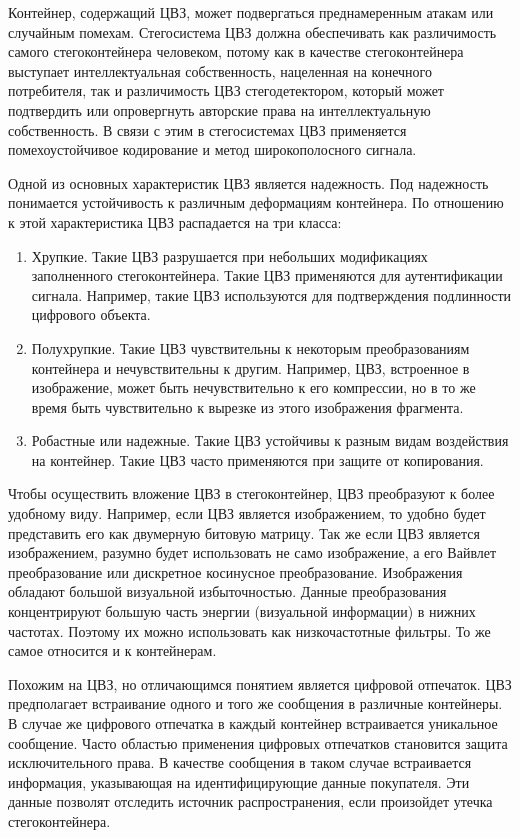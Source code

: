 Контейнер, содержащий ЦВЗ, может подвергаться преднамеренным атакам или случайным помехам.
Стегосистема ЦВЗ должна обеспечивать как различимость самого стегоконтейнера человеком,
потому как в качестве стегоконтейнера выступает интеллектуальная собственность,
нацеленная на конечного потребителя, так и различимость ЦВЗ стегодетектором,
который может подтвердить или опровергнуть авторские права на интеллектуальную собственность.
В связи с этим в стегосистемах ЦВЗ применяется помехоустойчивое кодирование и метод широкополосного сигнала.

Одной из основных характеристик ЦВЗ является надежность.
Под надежность понимается устойчивость к различным деформациям контейнера.
По отношению к этой характеристика ЦВЗ распадается на три класса:
\begin{enumerate}
    \item Хрупкие.
    Такие ЦВЗ разрушается при небольших модификациях заполненного стегоконтейнера.
    Такие ЦВЗ применяются для аутентификации сигнала.
    Например, такие ЦВЗ используются для подтверждения подлинности цифрового объекта.
    \item Полухрупкие.
    Такие ЦВЗ чувствительны к некоторым преобразованиям контейнера и нечувствительны к другим.
    Например, ЦВЗ, встроенное в изображение, может быть нечувствительно к его компрессии,
    но в то же время быть чувствительно к вырезке из этого изображения фрагмента.
    \item Робастные или надежные.
    Такие ЦВЗ устойчивы к разным видам воздействия на контейнер.
    Такие ЦВЗ часто применяются при защите от копирования.
\end{enumerate}

Чтобы осуществить вложение ЦВЗ в стегоконтейнер, ЦВЗ преобразуют к более удобному виду.
Например, если ЦВЗ является изображением, то удобно будет представить его как двумерную
битовую матрицу. Так же если ЦВЗ является изображением, разумно будет использовать не само
изображение, а его Вайвлет преобразование или дискретное косинусное преобразование. 
Изображения обладают большой визуальной избыточностью.
Данные преобразования концентрируют большую часть энергии (визуальной информации) в нижних частотах.
Поэтому их можно использовать как низкочастотные фильтры. То же самое относится и к контейнерам.

Похожим на ЦВЗ, но отличающимся понятием является цифровой отпечаток.
ЦВЗ предполагает встраивание одного и того же сообщения в различные контейнеры.
В случае же цифрового отпечатка в каждый контейнер встраивается уникальное сообщение.
Часто областью применения цифровых отпечатков становится защита исключительного права.
В качестве сообщения в таком случае встраивается информация, указывающая на идентифицирующие данные покупателя.
Эти данные позволят отследить источник распространения, если произойдет утечка стегоконтейнера.

